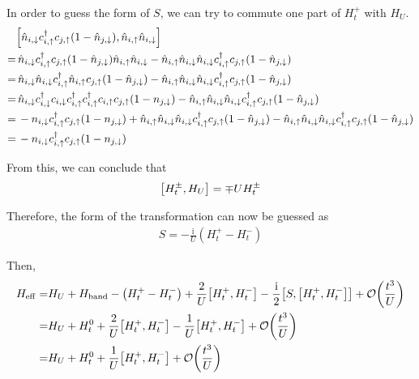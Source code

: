 \documentclass[]{report}
\newcommand{\I}{\,\mathrm{i}\,}
\begin{document}
In order to guess the form of $ S $, we can try to commute one part of $ H^{+}_{t} $ with $ H_U $.
\begin{align}
\nonumber
&\comm{\hat{n}_{i, \downarrow} c^{\dagger}_{i,\uparrow} c_{j, \uparrow} (1 - \hat{n}_{j, \downarrow})}{ \hat{n}_{i, \uparrow} \hat{n}_{i, \downarrow} }\\
\nonumber
=&\,
\hat{n}_{i, \downarrow} c^{\dagger}_{i,\uparrow} c_{j, \uparrow} (1 - \hat{n}_{j, \downarrow}) \hat{n}_{i, \uparrow} \hat{n}_{i, \downarrow}
-
\hat{n}_{i, \uparrow} \hat{n}_{i, \downarrow} \hat{n}_{i, \downarrow} c^{\dagger}_{i,\uparrow} c_{j, \uparrow} (1 - \hat{n}_{j, \downarrow})\\
\nonumber
=&\,
\hat{n}_{i, \downarrow}\hat{n}_{i, \downarrow} c^{\dagger}_{i,\uparrow}\hat{n}_{i, \uparrow} c_{j, \uparrow} (1 - \hat{n}_{j, \downarrow})  
-
\hat{n}_{i, \uparrow} \hat{n}_{i, \downarrow} \hat{n}_{i, \downarrow} c^{\dagger}_{i,\uparrow} c_{j, \uparrow} (1 - \hat{n}_{j, \downarrow})\\
\nonumber
=&\,
\hat{n}_{i, \downarrow} c^{\dagger}_{i, \downarrow} c_{i, \downarrow} c^{\dagger}_{i, \uparrow} c^{\dagger}_{i, \uparrow} c_{i, \uparrow} c_{j, \uparrow} (1 - n_{j, \downarrow})
-
\hat{n}_{i, \uparrow} \hat{n}_{i, \downarrow} \hat{n}_{i, \downarrow} c^{\dagger}_{i,\uparrow} c_{j, \uparrow} (1 - \hat{n}_{j, \downarrow})\\
\nonumber
=&\,
-n_{i, \downarrow} c^{\dagger}_{i, \uparrow} c_{j, \uparrow} (1 - n_{j, \downarrow})
+
\hat{n}_{i, \uparrow} \hat{n}_{i, \downarrow} \hat{n}_{i, \downarrow} c^{\dagger}_{i,\uparrow} c_{j, \uparrow} (1 - \hat{n}_{j, \downarrow})
-
\hat{n}_{i, \uparrow} \hat{n}_{i, \downarrow} \hat{n}_{i, \downarrow} c^{\dagger}_{i,\uparrow} c_{j, \uparrow} (1 - \hat{n}_{j, \downarrow})\\
=&\,
-n_{i, \downarrow} c^{\dagger}_{i, \uparrow} c_{j, \uparrow} (1 - n_{j, \downarrow})
\end{align}

From this, we can conclude that
\begin{align}
\comm{H^{\pm}_{t}}{H_U} = \mp U H^{\pm}_{t}
\end{align}

Therefore, the form of the transformation can now be guessed as
\begin{align}\label{eqn:swtransform}
S = - \frac{\I}{U} \left( H^{+}_{t} - H^{-}_{t} \right)
\end{align}

Then,
\begin{align}
\nonumber
H_{\mathrm{eff}} =& H_U + H_{\mathrm{band}} - \left( H^{+}_{t} - H^{-}_{t} \right) + \frac{2}{U} \comm{H^{+}_{t}}{H^{-}_{t}} - \frac{\I}{2} \comm{S}{\comm{H^{+}_{t}}{H^{-}_{t}}} + \order{\frac{t^3}{U}}\\
\nonumber
=& H_U + H^{0}_{t} + \frac{2}{U} \comm{H^{+}_{t}}{H^{-}_{t}} - \frac{1}{U} \comm{H^{+}_{t}}{H^{-}_{t}} + \order{\frac{t^3}{U}}\\
=& H_U + H^{0}_{t} + \frac{1}{U} \comm{H^{+}_{t}}{H^{-}_{t}} + \order{\frac{t^3}{U}}
\end{align}
\end{document}
